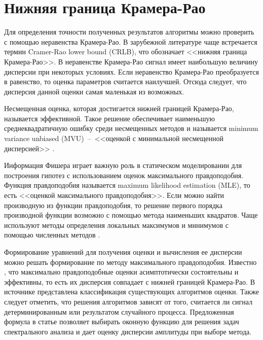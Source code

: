 \section{Нижняя граница Крамера-Рао} \label{sec:ch2/sec5} %
Для определения точности полученных результатов алгоритмы можно проверить с помощью неравенства Крамера-Рао. В зарубежной литературе чаще встречается термин Cramer-Rao lower bound (CRLB), что обозначает <<нижняя граница Крамера-Рао>>. В неравенстве Крамера-Рао сигнал имеет наибольшую величину дисперсии при некоторых условиях. Если неравенство Крамера-Рао преобразуется в равенство, то оценка параметров считается наилучшей. Отсюда следует, что дисперсия данной оценки самая маленькая из возможных. 

Несмещенная оценка, которая достигается нижней границей Крамера-Рао, называется эффективной. Такое решение обеспечивает наименьшую среднеквадратичную ошибку среди несмещенных методов и называется minimum variance unbiased (MVU)~--~<<оценкой с минимальной несмещенной дисперсией>> \cite{альтман2020граница}.

Информация Фишера играет важную роль в статическом моделировании для построения гипотез с использованием оценок максимального правдоподобия. Функция правдоподобия называется maximum likelihood estimation (MLE), то есть <<оценкой максимального правдоподобия>>. Если можно найти производную из функции правдоподобия, то решение первого порядка производной функции возможно с помощью метода наименьших квадратов. Чаще используют методы определения локальных максимумов и минимумов с помощью численных методов \cite{press1992art}.


Формирование уравнений для получения оценки и вычисления ее дисперсии можно решать формирование по методу максимального правдоподобия. Известно \cite{kay1993fundamentals}, что максимально правдоподобные оценки асимптотически состоятельны и эффективны, то есть их дисперсия совпадает с нижней границей Крамера-Рао. В источнике \cite{kay2013fundamentals} представлена классификация существующих алгоритмов оценки. Также следует отметить, что решения алгоритмов зависят от того, считается ли сигнал детерминированным или результатом случайного процесса. Предложенная формула в статье позволяет выбирать оконную функцию для решения задач спектрального анализа и дает оценку дисперсии амплитуды при выборе метода.

